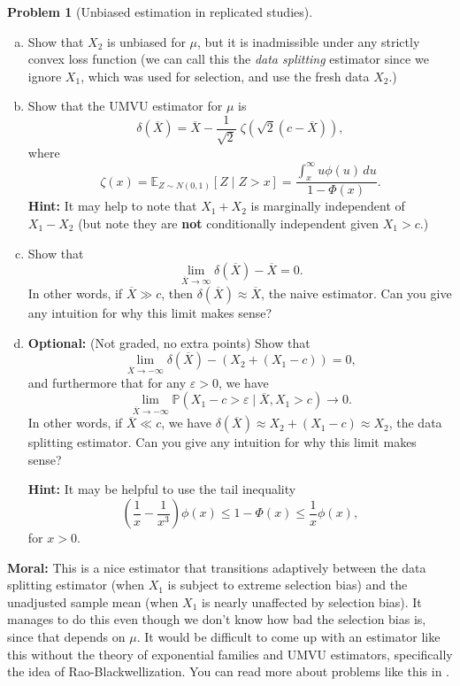 \documentclass{article}
\newcommand{\EE}{\mathbb{E}}
\newcommand{\PP}{\mathbb{P}}
\newcommand{\ep}{\varepsilon}
\newcommand{\optional}{{\bf Optional:} (Not graded, no extra points) }
\theoremstyle{definition}
\newtheorem{problem}{Problem}
\begin{document}
\begin{problem}[Unbiased estimation in replicated studies]
\begin{enumerate}[(a)]
\item Show that $X_2$ is unbiased for $\mu$, but it is inadmissible under any strictly convex loss function (we can call this the {\em data splitting} estimator since we ignore $X_1$, which was used for selection, and use the fresh data $X_2$.)



\item Show that the UMVU estimator for $\mu$ is
\[
\delta(\overline{X}) = \overline{X} - 
\frac{1}{\sqrt{2}}\;\zeta\left(\sqrt{2}(c-\overline{X})\right),
\]
where 
\[
\zeta(x) = \EE_{Z \sim N(0,1)}[Z \mid Z > x] = \frac{\int_x^\infty u\phi(u)\,d  u}{1-\Phi(x)}.
\]
{\bf Hint:} It may help to note that $X_1+X_2$ is marginally independent of $X_1 - X_2$ (but note they are {\bf not} conditionally independent given $X_1 > c$.)





\item Show that 
  \[
  \lim_{\overline{X} \to \infty} \delta(\overline{X}) - \overline{X} = 0.
  \]
  In other words, if $\overline{X} \gg c$, then $\delta(\overline{X}) \approx \overline{X}$, the naive estimator.
  Can you give any intuition for why this limit makes sense?





\item \optional Show that
  \[
  \lim_{\overline{X} \to -\infty} \delta(\overline{X}) - \left(X_2 + (X_1-c)\right) = 0,
  \]
  and furthermore that for any $\ep > 0$, we have
  \[
  \lim_{\overline{X} \to -\infty} \PP(X_1 - c > \ep \mid \overline{X}, X_1 > c) \to 0.
  \]
  In other words, if $\overline{X} \ll c$, we have $\delta(\overline{X}) \approx X_2 + (X_1-c) \approx X_2$, the data splitting estimator. Can you give any intuition for why this limit makes sense?

{\bf Hint:} It may be helpful to use the tail inequality
\[
\left(\frac{1}{x} - \frac{1}{x^3}\right)\phi(x) \leq 1-\Phi(x) \leq \frac{1}{x} \phi(x),
\]
for $x>0$.



\end{enumerate}


{\bf Moral:} This is a nice estimator that transitions adaptively between the data splitting estimator (when $X_1$ is subject to extreme selection bias) and the unadjusted sample mean (when $X_1$ is nearly unaffected by selection bias). It manages to do this even though we don't know how bad the selection bias is, since that depends on $\mu$. It would be difficult to come up with an estimator like this without the theory of exponential families and UMVU estimators, specifically the idea of Rao-Blackwellization. You can read more about problems like this in \citet{hung2020statistical}.

\end{problem}
\end{document}
